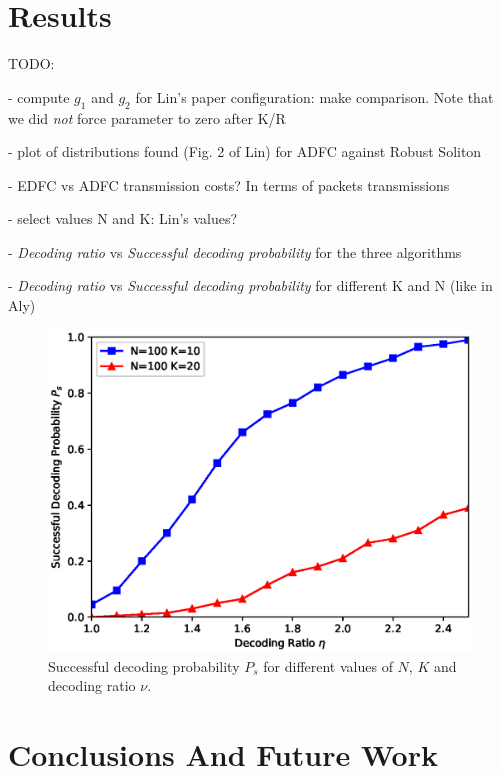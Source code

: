 \documentclass[journal]{IEEEtran}
\begin{document}
\section{Results} \label{sec:results}

TODO:

- compute $g_1$ and $g_2$ for Lin's paper configuration: make comparison. Note that we did \emph{not} force parameter to zero after K/R

- plot of distributions found (Fig. 2 of Lin) for ADFC against Robust Soliton

- EDFC vs ADFC transmission costs? In terms of packets transmissions

- select values N and K: Lin's values?

- \emph{Decoding ratio} vs \emph{Successful decoding probability} for the three algorithms

- \emph{Decoding ratio} vs \emph{Successful decoding probability} for different K and N (like in Aly)


\begin{figure}
	\centering
	\includegraphics[width=0.9\columnwidth]{ratiovsprob.eps}
	\caption{Successful decoding probability $P_s$ for different values of $N$, $K$ and decoding ratio $\nu$.}
	\label{fig:ratiovsprob}
\end{figure}

\section{Conclusions And Future Work}
\label{sec:conclusions}



\end{document}
